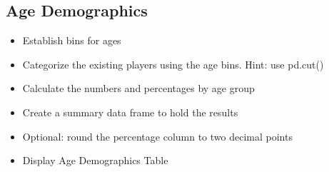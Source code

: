 \documentclass[11pt]{article}
\begin{document}
    \hypertarget{age-demographics}{%
\subsection{Age Demographics}\label{age-demographics}}

    \begin{itemize}
\item
  Establish bins for ages
\item
  Categorize the existing players using the age bins. Hint: use pd.cut()
\item
  Calculate the numbers and percentages by age group
\item
  Create a summary data frame to hold the results
\item
  Optional: round the percentage column to two decimal points
\item
  Display Age Demographics Table
\end{itemize}
\end{document}
